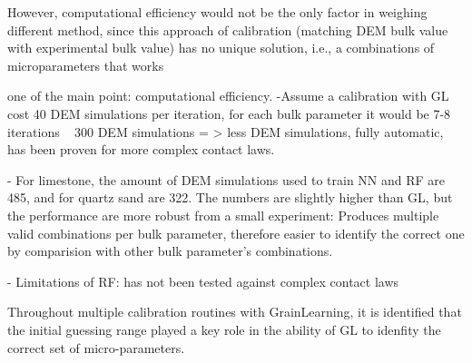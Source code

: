 However, computational efficiency would not be the only factor in weighing different method, since this approach of calibration (matching DEM bulk value with experimental bulk value) has no unique solution, i.e., a combinations of microparameters that works  



one of the main point: computational efficiency. 
-Assume a calibration with GL cost 40 DEM simulations per iteration, for each bulk parameter it would be 7-8 iterations ~ 300 DEM simulations = > less DEM simulations, fully automatic, has been proven for more complex contact laws. 

- For limestone, the amount of DEM simulations used to train NN and RF are 485, and for quartz sand are 322. The numbers are slightly higher than GL, but the performance are more robust from a small experiment: Produces multiple valid combinations per bulk parameter, therefore easier to identify the correct one by comparision with other bulk parameter's combinations. 

- Limitations of RF: has not been tested against complex contact laws

Throughout multiple calibration routines with GrainLearning, it is identified that the initial guessing range played a key role in the ability of GL to idenfity the correct set of micro-parameters.